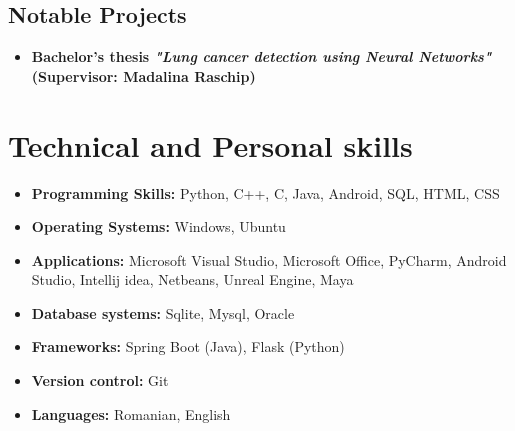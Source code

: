\documentclass[10pt,a4paper,sans]{moderncv}
\begin{document}
		\vspace{5pt}
		\subsection{Notable Projects}
			
			\begin{itemize}
				\vspace{2pt}
				\item{\textbf{Bachelor's thesis \textit{"Lung cancer detection using Neural Networks"}  (Supervisor: Madalina Raschip) }\textit{}}
				\vspace{2pt}
				\small{}
			\end{itemize}
			

	\section{Technical and Personal skills}
		\begin{itemize}

			\vspace{5pt}
			\item \textbf{Programming Skills:}  Python, C++, C, Java, Android, SQL, HTML, CSS
			
			\vspace{2pt}
			\item \textbf{Operating Systems:} Windows, Ubuntu
			
			\vspace{2pt}
			\item \textbf{Applications:} Microsoft Visual Studio, Microsoft Office, PyCharm, Android Studio, Intellij idea, Netbeans, Unreal Engine, Maya
			
			\vspace{2pt}
			\item \textbf{Database systems:} Sqlite, Mysql, Oracle
			
			\vspace{2pt}
			\item \textbf{Frameworks:} Spring Boot (Java), Flask (Python)

			\vspace{2pt}
			\item \textbf{Version control:} Git
			
			\vspace{2pt}
			\item \textbf{Languages:} Romanian, English
			
		\end{itemize}
	
\end{document}
